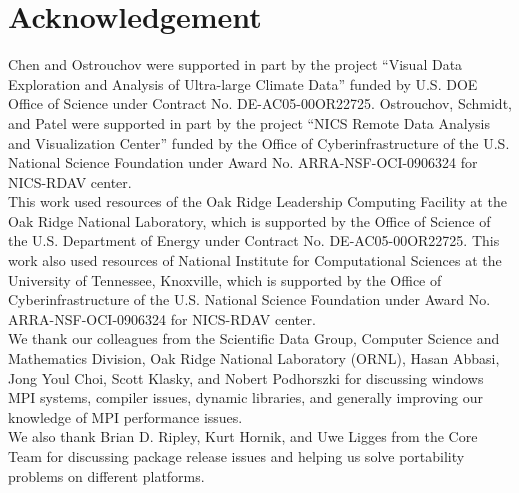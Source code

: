 
\section*{Acknowledgement}

Chen and Ostrouchov were supported in part by the project
``Visual Data Exploration and Analysis of Ultra-large Climate Data''
funded by U.S. DOE Office of Science
under Contract No. DE-AC05-00OR22725.
Ostrouchov, Schmidt, and Patel were supported in part by the project
``NICS Remote Data Analysis and Visualization Center''
funded by the Office of Cyberinfrastructure of the
U.S. National Science Foundation
under Award No. ARRA-NSF-OCI-0906324 for NICS-RDAV center.
\\

This work used resources of the Oak Ridge Leadership Computing Facility at the
Oak Ridge National Laboratory, which is supported by the Office of Science
of the U.S. Department of Energy under Contract No. DE-AC05-00OR22725.
This work also used resources of National Institute for Computational
Sciences at the University of Tennessee, Knoxville, which is supported
by the Office of Cyberinfrastructure of the U.S. National Science Foundation
under Award No. ARRA-NSF-OCI-0906324 for NICS-RDAV center.
\\

We thank our colleagues from the Scientific Data Group, Computer
Science and Mathematics Division, Oak Ridge National Laboratory
(ORNL), Hasan Abbasi, Jong Youl Choi, Scott Klasky, and Nobert
Podhorszki for discussing windows MPI systems, compiler issues,
dynamic libraries, and generally improving our knowledge of MPI
performance issues.
\\

We also thank Brian D. Ripley, Kurt Hornik, and Uwe Ligges from the
 Core Team for discussing package release issues and
helping us solve portability problems on different platforms.
\\
